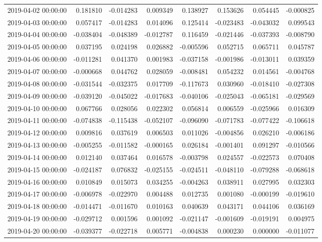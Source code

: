 \begin{tabular}{lrrrrrrr}
2019-04-02 00:00:00 & 0.181810 & -0.014283 & 0.009349 & 0.138927 & 0.153626 & 0.054445 & -0.000825 \\
2019-04-03 00:00:00 & 0.057417 & -0.014283 & 0.014096 & 0.125414 & -0.023483 & -0.043032 & 0.099543 \\
2019-04-04 00:00:00 & -0.038404 & -0.048389 & -0.012787 & 0.116459 & -0.021446 & -0.037393 & -0.008790 \\
2019-04-05 00:00:00 & 0.037195 & 0.024198 & 0.026882 & -0.005596 & 0.052715 & 0.065711 & 0.045787 \\
2019-04-06 00:00:00 & -0.011281 & 0.041370 & 0.001983 & -0.037158 & -0.001986 & -0.013011 & 0.039359 \\
2019-04-07 00:00:00 & -0.000668 & 0.044762 & 0.028059 & -0.008481 & 0.054232 & 0.014561 & -0.004768 \\
2019-04-08 00:00:00 & -0.031544 & -0.032375 & 0.017709 & -0.117673 & 0.030960 & -0.018410 & -0.027308 \\
2019-04-09 00:00:00 & -0.039120 & -0.045022 & -0.017683 & -0.040106 & -0.025043 & -0.065181 & -0.029569 \\
2019-04-10 00:00:00 & 0.067766 & 0.028056 & 0.022302 & 0.056814 & 0.006559 & -0.025966 & 0.016309 \\
2019-04-11 00:00:00 & -0.074838 & -0.115438 & -0.052107 & -0.096090 & -0.071783 & -0.077422 & -0.106618 \\
2019-04-12 00:00:00 & 0.009816 & 0.037619 & 0.006503 & 0.011026 & -0.004856 & 0.026210 & -0.006186 \\
2019-04-13 00:00:00 & -0.005255 & -0.011582 & -0.000165 & 0.026184 & -0.001401 & 0.091297 & -0.010566 \\
2019-04-14 00:00:00 & 0.012140 & 0.037464 & 0.016578 & -0.003798 & 0.024557 & -0.022573 & 0.070408 \\
2019-04-15 00:00:00 & -0.024187 & 0.076832 & -0.025155 & -0.024511 & -0.048110 & -0.079288 & -0.068618 \\
2019-04-16 00:00:00 & 0.010849 & 0.015073 & 0.034255 & -0.004263 & 0.038911 & 0.027995 & 0.032303 \\
2019-04-17 00:00:00 & -0.006978 & -0.022970 & 0.004488 & 0.012735 & 0.001080 & -0.000199 & -0.019610 \\
2019-04-18 00:00:00 & -0.014471 & -0.011670 & 0.010163 & 0.040639 & 0.043171 & 0.044106 & 0.036169 \\
2019-04-19 00:00:00 & -0.029712 & 0.001596 & 0.001092 & -0.021147 & -0.001609 & -0.019191 & 0.004975 \\
2019-04-20 00:00:00 & -0.039377 & -0.022718 & 0.005771 & -0.004838 & 0.000230 & 0.000000 & -0.011077 \\

\end{tabular}
